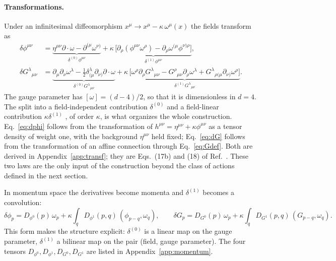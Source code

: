 \documentclass[prd,aps,preprint,superscriptaddress,nofootinbib,amsmath,amssymb,eqsecnum]{revtex4-2}
\newcommand{\ip}[1]{\int_{#1}}
\providecommand{\DIFdeltex}[1]{{\protect\color{red} \scriptsize #1}} %
\providecommand{\DIFdelbegin}{} %
\providecommand{\DIFdelend}{} %
\providecommand{\DIFdel}[1]{\texorpdfstring{\DIFdeltex{#1}}{}} %
\begin{document}
\paragraph{Transformations.} Under an infinitesimal diffeomorphism
$x^\mu\to x^\mu-\kappa\,\omega^\mu(x)$ the fields transform as
\begin{align}
\delta\phi^{\mu\nu}&=
\underbrace{\eta^{\mu\nu}\partial\!\cdot\!\omega-\partial^{(\mu}\omega^{\nu)}}_{\delta^{(0)}\phi^{\mu\nu}}
+\kappa\,\underbrace{\big[\partial_\rho(\phi^{\mu\nu}\omega^\rho)-\partial_\rho\omega^{(\mu}\phi^{\nu)\rho}\big]}_{\delta^{(1)}\phi^{\mu\nu}},
\label{eq:dphi}\\
\delta G^{\lambda}{}_{\mu\nu}&=
\underbrace{\partial_\mu\partial_\nu\omega^\lambda-\tfrac12\delta^{\lambda}_{(\mu}\partial_{\nu)}\partial\!\cdot\!\omega}_{\delta^{(0)}G^{\lambda}{}_{\mu\nu}}
+\kappa\,\underbrace{\big[\omega^\rho\partial_\rho G^{\lambda}{}_{\mu\nu}-G^{\rho}{}_{\mu\nu}\partial_\rho\omega^\lambda
+G^{\lambda}{}_{\rho(\mu}\partial_{\nu)}\omega^\rho\big]}_{\delta^{(1)}G^{\lambda}{}_{\mu\nu}}.
\label{eq:dG}
\end{align}
The \DIFdelbegin \DIFdel{gauge parameter has $[\omega]=(d-4)/2$, so that it is dimensionless in $d=4$. The
}\DIFdelend split into a field-independent contribution $\delta^{(0)}$ and a field-linear contribution
$\kappa\delta^{(1)}$ \DIFdelbegin \DIFdel{, of order $\kappa$, }\DIFdelend is what organizes the whole construction.
Eq.~\eqref{eq:dphi} follows from the transformation of $h^{\mu\nu}=\eta^{\mu\nu}+\kappa\phi^{\mu\nu}$
as a tensor density of weight one, with the background $\eta^{\mu\nu}$ held fixed;
Eq.~\eqref{eq:dG} follows from the transformation of an affine connection through
Eq.~\eqref{eq:Gdef}. Both are derived in Appendix~\ref{app:transf}; they are
Eqs.~(17b) and (18) of Ref.~\cite{BrandtMcKeon2015}. These two laws are the only input of the
construction beyond the class of actions defined in the next section.

In momentum space the derivatives become momenta and $\delta^{(1)}$ becomes a convolution:
\begin{equation}
\delta\phi_p=D_{\phi^0}(p)\,\omega_p+\kappa\ip{q}D_{\phi^1}(p,q)\,(\phi_{p-q},\omega_q),\qquad
\delta G_p=D_{G^0}(p)\,\omega_p+\kappa\ip{q}D_{G^1}(p,q)\,(G_{p-q},\omega_q).
\label{eq:dmom}
\end{equation}
\DIFdelbegin \DIFdel{This form makes the structure explicit: $\delta^{(0)}$ is a linear map on the gauge parameter,
$\delta^{(1)}$ a bilinear map on the pair (field, gauge parameter). }\DIFdelend The four tensors $D_{\phi^0},D_{\phi^1},D_{G^0},D_{G^1}$ are listed in Appendix~\ref{app:momentum}.
\end{document}
